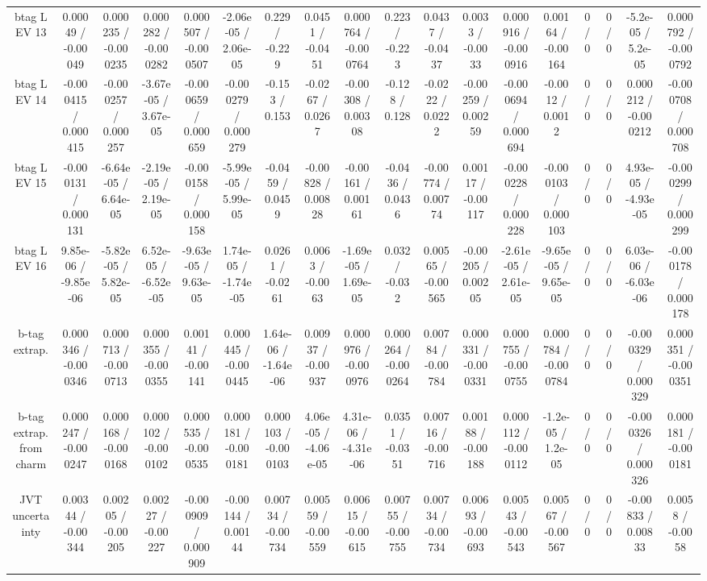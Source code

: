 \documentclass[10pt]{article}
\begin{document}
\begin{table}[htbp]
\begin{center}
\begin{tabular}{|c|c|c|c|c|c|c|c|c|c|c|c|c|c|c|c|c|c|}
  btag L EV 13 & 0.00049 / -0.00049 & 0.000235 / -0.000235 & 0.000282 / -0.000282 & 0.000507 / -0.000507 & -2.06e-05 / 2.06e-05 & 0.229 / -0.229 & 0.0451 / -0.0451 & 0.000764 / -0.000764 & 0.223 / -0.223 & 0.0437 / -0.0437 & 0.0033 / -0.0033 & 0.000916 / -0.000916 & 0.00164 / -0.00164 & 0 / 0 & 0 / 0 & -5.2e-05 / 5.2e-05 & 0.000792 / -0.000792 \\ 
  btag L EV 14 & -0.000415 / 0.000415 & -0.000257 / 0.000257 & -3.67e-05 / 3.67e-05 & -0.000659 / 0.000659 & -0.000279 / 0.000279 & -0.153 / 0.153 & -0.0267 / 0.0267 & -0.00308 / 0.00308 & -0.128 / 0.128 & -0.0222 / 0.0222 & -0.00259 / 0.00259 & -0.000694 / 0.000694 & -0.0012 / 0.0012 & 0 / 0 & 0 / 0 & 0.000212 / -0.000212 & -0.000708 / 0.000708 \\ 
  btag L EV 15 & -0.000131 / 0.000131 & -6.64e-05 / 6.64e-05 & -2.19e-05 / 2.19e-05 & -0.000158 / 0.000158 & -5.99e-05 / 5.99e-05 & -0.0459 / 0.0459 & -0.00828 / 0.00828 & -0.00161 / 0.00161 & -0.0436 / 0.0436 & -0.00774 / 0.00774 & 0.00117 / -0.00117 & -0.000228 / 0.000228 & -0.000103 / 0.000103 & 0 / 0 & 0 / 0 & 4.93e-05 / -4.93e-05 & -0.000299 / 0.000299 \\ 
  btag L EV 16 & 9.85e-06 / -9.85e-06 & -5.82e-05 / 5.82e-05 & 6.52e-05 / -6.52e-05 & -9.63e-05 / 9.63e-05 & 1.74e-05 / -1.74e-05 & 0.0261 / -0.0261 & 0.0063 / -0.0063 & -1.69e-05 / 1.69e-05 & 0.032 / -0.032 & 0.00565 / -0.00565 & -0.00205 / 0.00205 & -2.61e-05 / 2.61e-05 & -9.65e-05 / 9.65e-05 & 0 / 0 & 0 / 0 & 6.03e-06 / -6.03e-06 & -0.000178 / 0.000178 \\ 
  b-tag extrap. & 0.000346 / -0.000346 & 0.000713 / -0.000713 & 0.000355 / -0.000355 & 0.00141 / -0.00141 & 0.000445 / -0.000445 & 1.64e-06 / -1.64e-06 & 0.00937 / -0.00937 & 0.000976 / -0.000976 & 0.000264 / -0.000264 & 0.00784 / -0.00784 & 0.000331 / -0.000331 & 0.000755 / -0.000755 & 0.000784 / -0.000784 & 0 / 0 & 0 / 0 & -0.000329 / 0.000329 & 0.000351 / -0.000351 \\ 
  b-tag extrap. from charm & 0.000247 / -0.000247 & 0.000168 / -0.000168 & 0.000102 / -0.000102 & 0.000535 / -0.000535 & 0.000181 / -0.000181 & 0.000103 / -0.000103 & 4.06e-05 / -4.06e-05 & 4.31e-06 / -4.31e-06 & 0.0351 / -0.0351 & 0.00716 / -0.00716 & 0.00188 / -0.00188 & 0.000112 / -0.000112 & -1.2e-05 / 1.2e-05 & 0 / 0 & 0 / 0 & -0.000326 / 0.000326 & 0.000181 / -0.000181 \\ 
  JVT uncertainty & 0.00344 / -0.00344 & 0.00205 / -0.00205 & 0.00227 / -0.00227 & -0.000909 / 0.000909 & -0.00144 / 0.00144 & 0.00734 / -0.00734 & 0.00559 / -0.00559 & 0.00615 / -0.00615 & 0.00755 / -0.00755 & 0.00734 / -0.00734 & 0.00693 / -0.00693 & 0.00543 / -0.00543 & 0.00567 / -0.00567 & 0 / 0 & 0 / 0 & -0.00833 / 0.00833 & 0.0058 / -0.0058 \\ 

\end{tabular}
\end{center}
\end{table}
\end{document}

